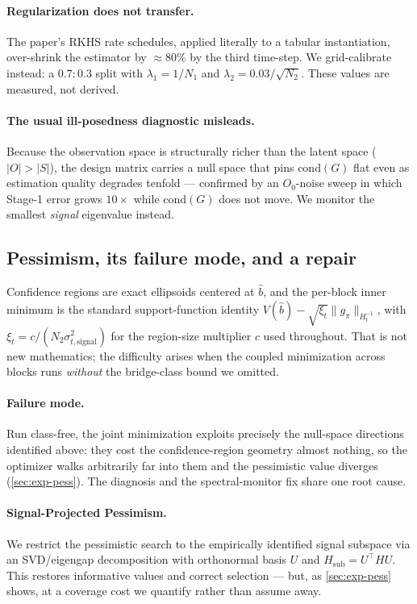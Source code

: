 \documentclass{article}
\theoremstyle{plain}
\theoremstyle{definition}
\begin{document}
\paragraph{Regularization does not transfer.} The paper's RKHS rate schedules,
applied literally to a tabular instantiation, over-shrink the estimator by
$\approx\!80\%$ by the third time-step. We grid-calibrate instead: a $0.7{:}0.3$
split with $\lambda_1 = 1/N_1$ and $\lambda_2 = 0.03/\sqrt{N_2}$. These values
are measured, not derived.

\paragraph{The usual ill-posedness diagnostic misleads.} Because the observation
space is structurally richer than the latent space ($|O| > |S|$), the design
matrix carries a null space that pins $\mathrm{cond}(G)$ flat even as estimation
quality degrades tenfold --- confirmed by an $O_0$-noise sweep in which Stage-1
error grows $10\times$ while $\mathrm{cond}(G)$ does not move. We monitor the
smallest \emph{signal} eigenvalue instead.

\subsection{Pessimism, its failure mode, and a repair}
\label{sec:method-pess}
Confidence regions are exact ellipsoids centered at $\hat b$, and the per-block
inner minimum is the standard support-function identity
$V(\hat b) - \sqrt{\xi_t}\lVert g_\pi \rVert_{H_t^{-1}}$, with
$\xi_t = c/(N_2\sigma^2_{t,\mathrm{signal}})$ for the region-size multiplier $c$
used throughout. That is not new mathematics; the difficulty arises when the
coupled minimization across blocks runs \emph{without} the bridge-class bound we
omitted.

\paragraph{Failure mode.} Run class-free, the joint minimization exploits
precisely the null-space directions identified above: they cost the
confidence-region geometry almost nothing, so the optimizer walks arbitrarily far
into them and the pessimistic value diverges (\cref{sec:exp-pess}). The
diagnosis and the spectral-monitor fix share one root cause.

\paragraph{Signal-Projected Pessimism.} We restrict the pessimistic search to the
empirically identified signal subspace via an SVD/eigengap decomposition with
orthonormal basis $U$ and $H_{\mathrm{sub}} = U^\top H U$. This restores
informative values and correct selection --- but, as \cref{sec:exp-pess} shows,
at a coverage cost we quantify rather than assume away.
\end{document}

